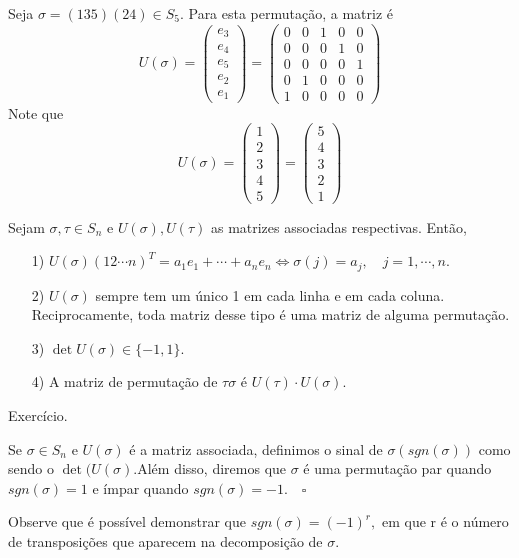 \documentclass[Algebra/algebra_notes.tex]{subfiles}
\begin{document}
\begin{example*}
	Seja $\sigma = (135)(24)\in S_{5}.$ Para esta permutação, a matriz é
	$$
		U(\sigma) =
		\begin{pmatrix}
			e_{3} \\
			e_{4} \\
			e_{5} \\
			e_{2} \\
			e_{1}
		\end{pmatrix} =
		\begin{pmatrix}
			0 & 0 & 1 & 0 & 0 \\
			0 & 0 & 0 & 1 & 0 \\
			0 & 0 & 0 & 0 & 1 \\
			0 & 1 & 0 & 0 & 0 \\
			1 & 0 & 0 & 0 & 0
		\end{pmatrix}
	$$
	Note que
	$$
		U(\sigma) = \begin{pmatrix}
			1 \\
			2 \\
			3 \\
			4 \\
			5
		\end{pmatrix} =
		\begin{pmatrix}
			5 \\
			4 \\
			3 \\
			2 \\
			1
		\end{pmatrix}
	$$
\end{example*}
\begin{prop*}
	Sejam $\sigma, \tau\in S_{n}$ e $U(\sigma), U(\tau)$ as matrizes associadas respectivas. Então,
	\begin{itemize}
		\item[1)] $U(\sigma)(12 \cdots n)^{T} = a_{1}e_{1} + \cdots + a_{n}e_{n} \Longleftrightarrow \sigma(j) = a_{j},\quad j = 1, \cdots, n.$
		\item[2)] $U(\sigma)$ sempre tem um único 1 em cada linha e em cada coluna. Reciprocamente, toda matriz desse tipo
		      é uma matriz de alguma permutação.
		\item[3)] $\det{U(\sigma)}\in\{-1, 1\}.$
		\item[4)] A matriz de permutação de $\tau\sigma$ é $U(\tau)\cdot U(\sigma)$.
	\end{itemize}
\end{prop*}
\begin{proof*}
	Exercício.
\end{proof*}
\begin{def*}
	Se $\sigma\in S_{n}$ e $U(\sigma)$ é a matriz associada, definimos o sinal de $\sigma (sgn(\sigma))$ como sendo o
	$\det{(U(\sigma)}.$Além disso, diremos que $\sigma$ é uma permutação par quando $sgn(\sigma) = 1$ e ímpar quando
	$sgn(\sigma) = -1.\quad\square$
\end{def*}
Observe que é possível demonstrar que $sgn(\sigma) = (-1)^{r},$ em que r é o número de transposições que aparecem
na decomposição de $\sigma.$
\end{document}
